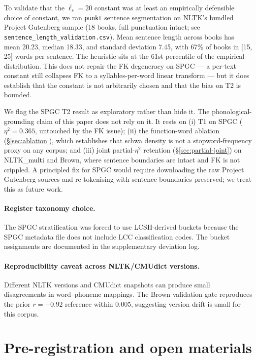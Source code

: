 \documentclass[11pt,a4paper]{article}
\begin{document}
To validate that the \(\overline{\ell_s}=20\) constant was at least
an empirically defensible choice of constant, we ran \texttt{punkt}
sentence segmentation on NLTK's bundled Project Gutenberg sample
(18 books, full punctuation intact; see
\texttt{sentence\_length\_validation.csv}). Mean sentence length
across books has mean 20.23, median 18.33, and standard deviation
7.45, with 67\% of books in [15, 25] words per sentence. The
heuristic sits at the 61st percentile of the empirical distribution.
This does not repair the FK degeneracy on SPGC --- a per-text
constant still collapses FK to a syllables-per-word linear transform
--- but it does establish that the constant is not arbitrarily chosen
and that the bias on T2 is bounded.

We flag the SPGC T2 result as exploratory rather than hide it. The
phonological-grounding claim of this paper does not rely on it. It
rests on (i) T1 on SPGC (\(\eta^2 = 0.365\), untouched by the FK
issue); (ii) the function-word ablation (§\ref{sec:ablation}), which
establishes that schwa density is not a stopword-frequency proxy on
any corpus; and (iii) joint partial-\(\eta^2\) retention
(§\ref{sec:partial-joint}) on NLTK\_multi and Brown, where sentence
boundaries are intact and FK is not crippled. A principled fix for
SPGC would require downloading the raw Project Gutenberg sources and
re-tokenising with sentence boundaries preserved; we treat this as
future work.

\paragraph{Register taxonomy choice.} The SPGC stratification was forced
to use LCSH-derived buckets because the SPGC metadata file does not
include LCC classification codes. The bucket assignments are documented
in the supplementary deviation log.

\paragraph{Reproducibility caveat across NLTK/CMUdict versions.}
Different NLTK versions and CMUdict snapshots can produce small
disagreements in word--phoneme mappings. The Brown validation gate
reproduces the prior \(r{=}-0.92\) reference within 0.005, suggesting
version drift is small for this corpus.

\section{Pre-registration and open materials}
\end{document}
